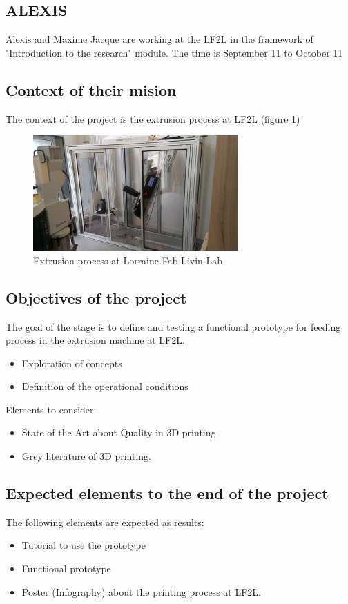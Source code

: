 \subsection{ALEXIS} 

Alexis and Maxime Jacque are working at the LF2L in the framework of "Introduction to the research" module.
The time is September 11 to October 11

\subsection{Context of their mision}

The context of the project is the extrusion process at LF2L (figure \ref{Context.Nicolas.Maxime})

\begin{figure}[H]
	\centering
	\includegraphics[width=0.7\textwidth]{Figures/Extrusion/Extruder.jpg}
	\caption{Extrusion process at Lorraine Fab Livin Lab}
	\label{Context.Nicolas.Maxime}
\end{figure}


\subsection{Objectives of the project}


The goal of the stage is to define and testing a functional prototype for feeding process in the extrusion machine at LF2L.




\begin{itemize}
	\item Exploration of concepts
	\item Definition of the operational conditions
\end{itemize}


Elements to consider:

\begin{itemize}
	\item State of the Art about Quality in 3D printing.
	\item Grey literature of 3D printing. 
\end{itemize}


\subsection{Expected elements to the end of the project}

The following elements are expected as results:

\begin{itemize}
	\item Tutorial to use the prototype
	\item Functional prototype
	\item Poster (Infography)  about the printing process at LF2L.
\end{itemize}

